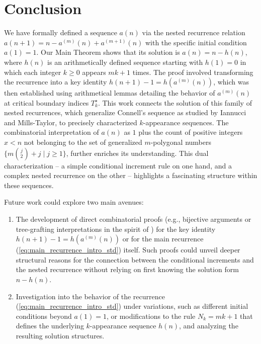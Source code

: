 \documentclass[11pt,a4paper]{article} %
\theoremstyle{remark}
\begin{document}
\section{Conclusion} \label{sec:conclusion}
We have formally defined a sequence $a(n)$ via the nested recurrence relation $a(n+1)=n-a^{(m)}(n)+a^{(m+1)}(n)$ with the specific initial condition $a(1)=1$. Our Main Theorem shows that its solution is $a(n)=n-h(n)$, where $h(n)$ is an arithmetically defined sequence starting with $h(1)=0$ in which each integer $k \ge 0$ appears $mk+1$ times. The proof involved transforming the recurrence into a key identity $h(n+1)-1=h(a^{(m)}(n))$, which was then established using arithmetical lemmas detailing the behavior of $a^{(m)}(n)$ at critical boundary indices $T^{\star}_k$. This work connects the solution of this family of nested recurrences, which generalize Connell's sequence as studied by Iannucci and Mills-Taylor, to precisely characterized $k$-appearance sequences. The combinatorial interpretation of $a(n)$ as $1$ plus the count of positive integers $x<n$ not belonging to the set of generalized $m$-polygonal numbers $\{m\binom{j}{2}+j \mid j \ge 1\}$, further enriches its understanding. This dual characterization -- a simple conditional increment rule on one hand, and a complex nested recurrence on the other -- highlights a fascinating structure within these sequences.

Future work could explore two main avenues:
\begin{enumerate}
    \item The development of direct combinatorial proofs (e.g., bijective arguments or tree-grafting interpretations in the spirit of \cite{Deugau2009Ruskey, Fox2022}) for the key identity $h(n+1)-1=h(a^{(m)}(n))$ or for the main recurrence (\ref{eq:main_recurrence_intro_std}) itself. Such proofs could unveil deeper structural reasons for the connection between the conditional increments and the nested recurrence without relying on first knowing the solution form $n-h(n)$.
    \item Investigation into the behavior of the recurrence (\ref{eq:main_recurrence_intro_std}) under variations, such as different initial conditions beyond $a(1)=1$, or modifications to the rule $N_k = mk+1$ that defines the underlying $k$-appearance sequence $h(n)$, and analyzing the resulting solution structures.
\end{enumerate}
\end{document}
